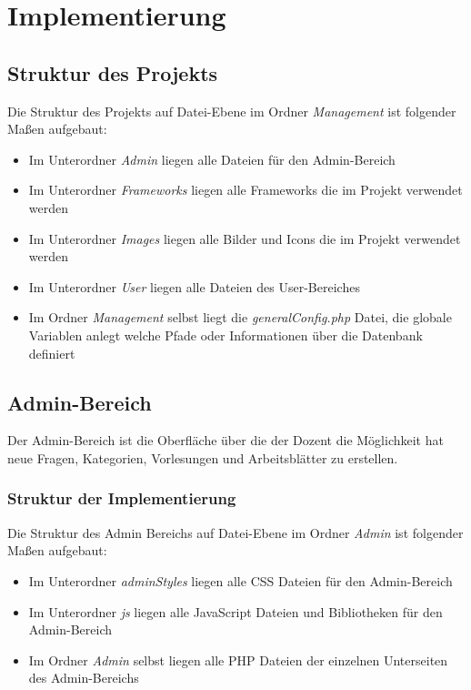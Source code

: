 \chapter{Implementierung}

\section{Struktur des Projekts}
Die Struktur des Projekts auf Datei-Ebene im Ordner \emph{Management} ist folgender
Maßen aufgebaut:

\begin{singlespacing}
	\begin{itemize}
		\item Im Unterordner \emph{Admin} liegen alle Dateien für den Admin-Bereich
		\item Im Unterordner \emph{Frameworks} liegen alle Frameworks die im Projekt verwendet werden
		\item Im Unterordner \emph{Images} liegen alle Bilder und Icons die im Projekt verwendet werden 
		\item Im Unterordner \emph{User} liegen alle Dateien des User-Bereiches
		\item Im Ordner \emph{Management} selbst liegt die \emph{generalConfig.php} Datei, die
		globale Variablen anlegt welche Pfade oder Informationen über die Datenbank
		definiert
	\end{itemize}
\end{singlespacing}


\section{Admin-Bereich}
Der Admin-Bereich ist die Oberfläche über die der Dozent die Möglichkeit hat
neue Fragen, Kategorien, Vorlesungen und Arbeitsblätter zu erstellen.



\subsection{Struktur der Implementierung}
Die Struktur des Admin Bereichs auf Datei-Ebene im Ordner \emph{Admin} ist
folgender Maßen aufgebaut:

\begin{singlespacing}
	\begin{itemize}
		\item Im Unterordner \emph{adminStyles} liegen alle CSS Dateien für den Admin-Bereich
		\item Im Unterordner \emph{js} liegen alle JavaScript Dateien und Bibliotheken für den
		Admin-Bereich
		\item Im Ordner \emph{Admin} selbst liegen alle \gls{PHP} Dateien der einzelnen Unterseiten 
		des Admin-Bereichs
	\end{itemize}
\end{singlespacing}


